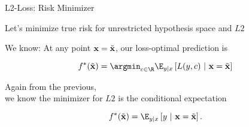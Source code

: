 \documentclass[11pt,compress,t,notes=noshow, xcolor=table]{beamer}
\begin{document}
\begin{framei}[sep=S]{L2-Loss: Risk Minimizer}

\item Let's minimize true risk for unrestricted hypothesis space and $L2$

\item We know: At any point $\mathbf{x} = \tilde{\mathbf{x}}$, our loss-optimal prediction is 

$$\fbayes(\xtil) = \argmin_{c \in \R} \E_{y|x}\left[L(y, c)~|~ \xv = \xtil \right]$$ 

\item Again from the previous, \\
we know the minimizer for $L2$ is the conditional expectation 

$$f^{\ast}(\xtil) = \E_{y|x} \left[y ~|~ \xv = \xtil \right]. $$









\end{framei}
\end{document}
